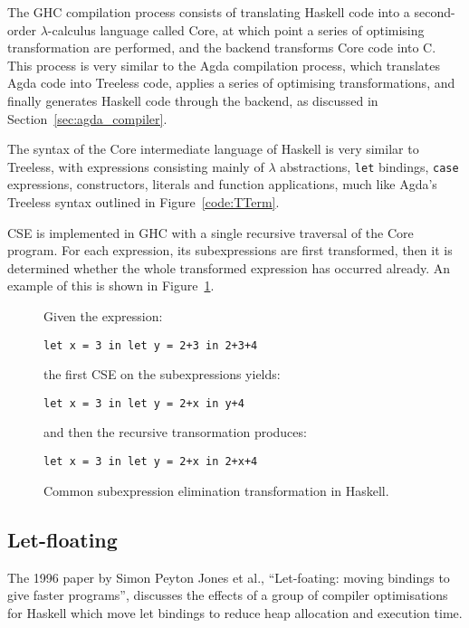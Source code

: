 The GHC compilation process consists of translating Haskell code into a second-order $\lambda$-calculus language called Core, at which point a series of optimising transformation are performed, and the backend transforms Core code into C.\cite{chitil1997} This process is very similar to the Agda compilation process, which translates Agda code into Treeless code, applies a series of optimising transformations, and finally generates Haskell code through the backend, as discussed in Section~\ref{sec:agda_compiler}. %

The syntax of the Core intermediate language of Haskell is very similar to Treeless, with expressions consisting mainly of $\lambda$ abstractions, \lstinline{let} bindings, \lstinline{case} expressions, constructors, literals and function applications, much like Agda's Treeless syntax outlined in Figure~\ref{code:TTerm}.

CSE is implemented in GHC with a single recursive traversal of the Core program. For each expression, its subexpressions are first transformed, then it is determined whether the whole transformed expression has occurred already.\cite{chitil1997} An example of this is shown in Figure~\ref{code:cse_haskell}.

\begin{figure}
Given the expression:

\lstinline{let x = 3 in let y = 2+3 in 2+3+4}

the first CSE on the subexpressions yields:

\lstinline{let x = 3 in let y = 2+x in y+4}

and then the recursive transormation produces:

\lstinline{let x = 3 in let y = 2+x in 2+x+4}

\caption{Common subexpression elimination transformation in Haskell.\cite{chitil1997}}
\label{code:cse_haskell}
\end{figure}

\subsection{Let-floating}

The 1996 paper by Simon Peyton Jones et al., ``Let-foating: moving bindings to give faster programs'', discusses the effects of a group of compiler optimisations for Haskell which move let bindings to reduce heap allocation and execution time.\cite{jones1996}

